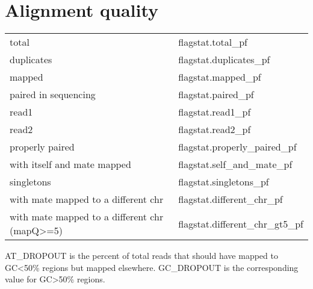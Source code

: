 \documentclass[a4paper,12pt]{scrartcl}
\begin{document}
{{{{{{{{{{{{{{{{{\newpage
\section*{Alignment quality}

{%
\begin{minipage}{\linewidth}
\centering
{} \label{tab:title} 
\begin{small}
\begin{tabular}{ll}
total&{{ flagstat.total_pf }}\\
duplicates&{{ flagstat.duplicates_pf }}\\
mapped&{{ flagstat.mapped_pf }}\\
paired in sequencing&{{ flagstat.paired_pf }}\\
read1&{{ flagstat.read1_pf }}\\
read2&{{ flagstat.read2_pf }}\\
properly paired&{{ flagstat.properly_paired_pf }}\\
with itself and mate mapped&{{ flagstat.self_and_mate_pf }}\\
singletons&{{ flagstat.singletons_pf }}\\
with mate mapped to a different chr&{{ flagstat.different_chr_pf }}\\
with mate mapped to a different chr (mapQ\textgreater=5)&{{ flagstat.different_chr_gt5_pf }}\\
\end{tabular}
\end{small}\par
\end{minipage}
{%

{%
\begin{minipage}{\linewidth}
\centering
{} \label{tab:title} 
\bigskip
\begin{small}
\par
\bigskip
AT\_DROPOUT is the percent of total reads that should have mapped to GC\textless50\% regions but mapped elsewhere. GC\_DROPOUT is the corresponding value for GC\textgreater50\% regions.
\end{small}
\end{minipage}
{%

}}}}}}}}}}}}}}}}}}}}}
\end{document}
